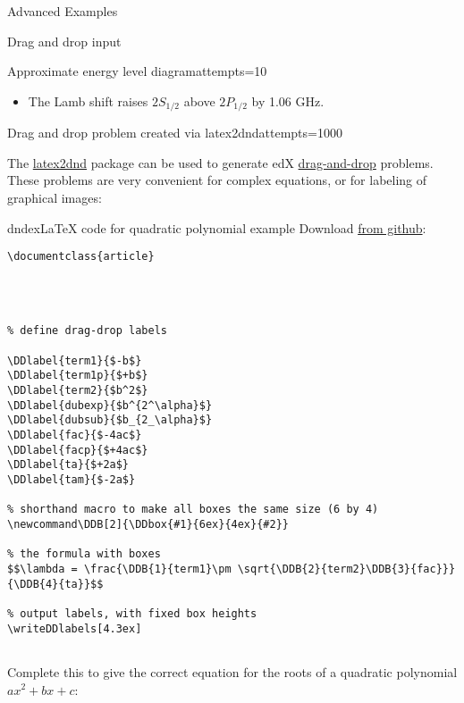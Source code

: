 \begin{edXchapter}{Advanced Examples}
\begin{edXsection}{Drag and drop input}
\begin{edXvertical}
\begin{edXproblem}{Approximate energy level diagram}{attempts=10}
\begin{edXsolution}
\begin{itemize}
\item The Lamb shift raises $2S_{1/2}$ above $2P_{1/2}$ by 1.06 GHz.

\end{itemize}

\end{edXsolution}

\end{edXproblem}


\end{edXvertical}


\begin{edXvertical}

\begin{edXproblem}{Drag and drop problem created via latex2dnd}{attempts=1000}

The \href{https://github.com/mitocw/latex2dnd}{latex2dnd} package can
be used to generate edX
\href{http://edx.readthedocs.org/projects/devdata/en/latest/course_data_formats/drag_and_drop/drag_and_drop_input.html}{drag-and-drop}
problems.  These problems are very convenient for complex equations,
or for labeling of graphical images:

\begin{edXshowhide}{dndex}{LaTeX code for quadratic polynomial example}
Download \href{https://github.com/mitocw/latex2dnd/blob/master/latex2dnd/testtex/quadratic.tex}{from github}:
\begin{verbatim}
\documentclass{article}




% define drag-drop labels

\DDlabel{term1}{$-b$}
\DDlabel{term1p}{$+b$}
\DDlabel{term2}{$b^2$}
\DDlabel{dubexp}{$b^{2^\alpha}$}
\DDlabel{dubsub}{$b_{2_\alpha}$}
\DDlabel{fac}{$-4ac$}
\DDlabel{facp}{$+4ac$}
\DDlabel{ta}{$+2a$}
\DDlabel{tam}{$-2a$}

% shorthand macro to make all boxes the same size (6 by 4)
\newcommand\DDB[2]{\DDbox{#1}{6ex}{4ex}{#2}}

% the formula with boxes
$$\lambda = \frac{\DDB{1}{term1}\pm \sqrt{\DDB{2}{term2}\DDB{3}{fac}}}{\DDB{4}{ta}}$$

% output labels, with fixed box heights
\writeDDlabels[4.3ex]


\end{verbatim}
\end{edXshowhide}

Complete this to give the correct equation for the roots of a
quadratic polynomial $ax^2 + bx + c$:


\end{edXproblem}
\end{edXvertical}
\end{edXsection}
\end{edXchapter}
